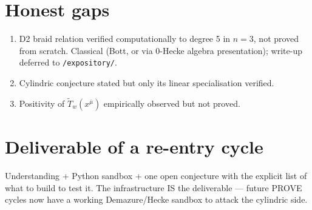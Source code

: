 \documentclass[11pt]{article}
\begin{document}
\section{Honest gaps}

\begin{enumerate}
\item D2 braid relation verified computationally to degree 5 in $n = 3$,
  not proved from scratch. Classical (Bott, or via 0-Hecke algebra
  presentation); write-up deferred to \texttt{/expository/}.
\item Cylindric conjecture stated but only its linear specialisation
  verified.
\item Positivity of $\widetilde{T}_w(x^{\bar\mu})$ empirically observed
  but not proved.
\end{enumerate}

\section{Deliverable of a re-entry cycle}

Understanding + Python sandbox + one open conjecture with the explicit list
of what to build to test it. The infrastructure IS the deliverable ---
future PROVE cycles now have a working Demazure/Hecke sandbox to attack the
cylindric side.
\end{document}
